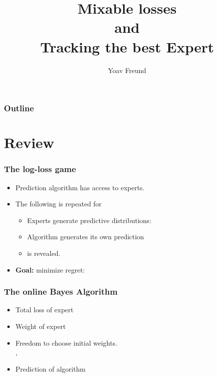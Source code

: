 \documentclass{beamer}
\title %
{Mixable losses \\ and \\ Tracking the best Expert}
\author[Freund] %
{Yoav Freund}
\institute[Universities of Somewhere and Elsewhere] %
\begin{document}
%


\begin{frame}
  \titlepage
\end{frame}

\begin{frame}
  \frametitle{Outline}
  \tableofcontents[pausesections]
\end{frame}

\section{Review}

\begin{frame}
\frametitle{The log-loss game}
\begin{itemize}
\item Prediction algorithm  has access to  experts.
\item The following is repeated for 
\begin{itemize}
\item Experts generate predictive distributions: 
\item Algorithm generates its own prediction 
\item {} is revealed.
\end{itemize}
\item {\bf Goal:} minimize regret:
\R{\[
-\sum_{t=1}^T \log p_A^t(c^t) + \min_{i=1,\dots,N} \paren{-\sum_{t=1}^T \log p_i^t(c^t)} 
\]}
\end{itemize}

\end{frame}

\begin{frame}
\frametitle{The online Bayes Algorithm}
\begin{itemize}
\item {\color{blue} Total loss} of expert 
\item {\color{blue}Weight} of expert 
\item
Freedom to choose initial weights.\\
 , 
\item {\color{blue}Prediction} of algorithm 
\R{\[
\vp_A^t = \frac{\sum_{i=1}^N \wt{t}{i} \vp_i^t}{\sum_{i=1}^N \wt{t}{i}}
\]}
\end{itemize}
\end{frame}
\end{document}
